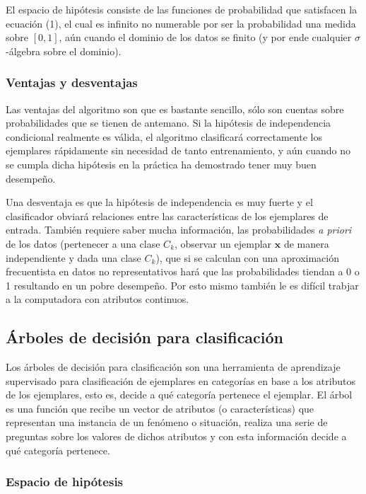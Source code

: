 \documentclass[spanish,11pt,letterpaper]{article}
\renewcommand{\vec}[1]{\mathbf{#1}}
\begin{document}
El espacio de hipótesis consiste de las funciones de probabilidad que satisfacen
la ecuación (1), el cual es infinito no numerable por ser la probabilidad una
medida sobre $[0,1]$, aún cuando el dominio de los datos se finito (y por ende
cualquier $\sigma$-álgebra sobre el dominio).

\subsubsection{Ventajas y desventajas}

Las ventajas del algoritmo son que es bastante sencillo, sólo son cuentas sobre
probabilidades que se tienen de antemano. Si la hipótesis de independencia
condicional realmente es válida, el algoritmo clasificará correctamente los
ejemplares rápidamente sin necesidad de tanto entrenamiento, y aún cuando
no se cumpla dicha hipótesis en la práctica ha demostrado tener muy buen
desempeño.

Una desventaja es que la hipótesis de independencia es muy fuerte y el clasificador
obviará relaciones entre las características de los ejemplares de entrada. También
requiere saber mucha información, las probabilidades \textit{a priori} de los datos
(pertenecer a una clase $C_k$, observar un ejemplar $\vec{x}$ de manera
independiente y dada una clase $C_k$), que si se calculan con una aproximación
frecuentista en datos no representativos hará que las probabilidades tiendan a 0
o 1 resultando en un pobre desempeño. Por esto mismo también le es difícil trabjar
a la computadora con atributos continuos.

\subsection{Árboles de decisión para clasificación}

Los árboles de decisión para clasificación son una herramienta de aprendizaje
supervisado para clasificación de ejemplares en categorías en base a los
atributos de los ejemplares, esto es, decide a qué categoría pertenece el
ejemplar. El árbol es una función que recibe un vector de atributos (o características) que
representan una instancia de un fenómeno o situación, realiza una serie de
preguntas sobre los valores de dichos atributos y con esta información
decide a qué categoría pertenece.

\subsubsection{Espacio de hipótesis}
\end{document}
